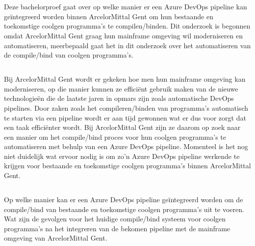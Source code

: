 
\chapter{}%
\label{ch:inleiding}

Deze bachelorproef gaat over op welke manier er een Azure DevOps pipeline kan geïntegreerd worden binnen ArcelorMittal Gent om hun bestaande en toekomstige coolgen programma's te compilen/binden. 
Dit onderzoek is begonnen omdat ArcelorMittal Gent graag hun mainframe omgeving wil moderniseren en automatiseren, meerbepaald gaat het in dit onderzoek over het automatiseren van de compile/bind van coolgen programma's.



\section{}%
\label{sec:probleemstelling}

Bij ArcelorMittal Gent wordt er gekeken hoe men hun mainframe omgeving kan moderniseren, op die manier kunnen ze efficiënt gebruik maken van de nieuwe technologieën die de laatste jaren in opmars zijn zoals automatische DevOps pipelines. 
Door zaken zoals het compileren/binden van programma's automatisch te starten via een pipeline wordt er aan tijd gewonnen wat er dus voor zorgt dat een taak efficiënter wordt. 
Bij ArcelorMittal Gent zijn ze daarom op zoek naar een manier om het compile/bind proces voor hun coolgen programma's te automatiseren met behulp van een Azure DevOps pipeline.
Momenteel is het nog niet duidelijk wat ervoor nodig is om zo'n Azure DevOps pipeline werkende te krijgen voor bestaande en toekomstige coolgen programma's binnen ArcelorMittal Gent.

\section{}%
\label{sec:onderzoeksvraag}

Op welke manier kan er een Azure DevOps pipeline geïntegreerd worden om de compile/bind van bestaande en toekomstige coolgen programma's uit te voeren. 
Wat zijn de gevolgen voor het huidige compile/bind systeem voor coolgen programma's na het integreren van de bekomen pipeline met de mainframe omgeving van ArcelorMittal Gent. 

